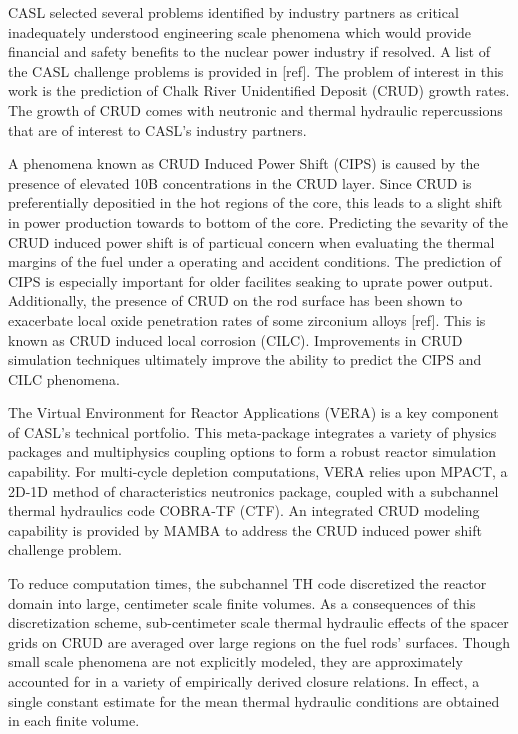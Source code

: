 CASL selected several problems identified by industry partners as critical
inadequately understood engineering scale phenomena which would provide financial and
safety benefits to the nuclear power industry if resolved.  A list of the CASL
challenge problems is provided in [ref].  The problem of interest in this
work is the prediction of Chalk River Unidentified Deposit (CRUD) growth rates.
The growth of CRUD comes with neutronic and thermal hydraulic repercussions that are of
interest to CASL's industry partners.  

A phenomena known as CRUD Induced Power Shift (CIPS) is caused by the presence of elevated 10B concentrations in the CRUD layer.  Since CRUD is preferentially depositied in the hot regions of the core, this leads to a slight shift in power production towards to bottom of the core.  Predicting the sevarity of the CRUD induced power shift is of particual concern when evaluating the
thermal margins of the fuel under a operating and accident conditions.  The prediction of CIPS is especially important for older facilites seaking to uprate power output.
Additionally, the presence of CRUD on the rod
surface has been shown to exacerbate local oxide penetration rates of some zirconium alloys [ref].
This is known as CRUD induced local corrosion (CILC).  Improvements in CRUD simulation techniques ultimately improve the ability to predict the CIPS and CILC phenomena.

The Virtual Environment for Reactor Applications (VERA) is a key component of
CASL's technical portfolio.  This meta-package integrates a variety of physics
packages and multiphysics coupling options to form a robust reactor simulation
capability.  For multi-cycle depletion computations, VERA relies upon MPACT, a
2D-1D method of characteristics neutronics package, coupled with a subchannel
thermal hydraulics code COBRA-TF (CTF).  An integrated CRUD modeling capability
is provided by MAMBA to address the CRUD induced power shift challenge problem.

To reduce computation times, the subchannel TH code discretized the reactor
domain into large, centimeter scale finite volumes. As a consequences of this discretization scheme, sub-centimeter scale
thermal hydraulic effects of the spacer grids on CRUD are averaged over
large regions on the fuel rods' surfaces.  Though small scale phenomena are not
explicitly modeled, they are approximately accounted for in a variety of empirically derived
closure relations.  In effect, a single constant estimate for the mean thermal
hydraulic conditions are obtained in each finite volume.

